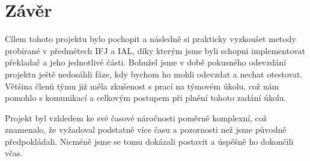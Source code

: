 \documentclass[a4paper, 12pt]{article} %
\begin{document}
    \section{Závěr}
        Cílem tohoto projektu bylo pochopit a následně si prakticky vyzkoušet metody 
        probírané v předmětech IFJ a IAL, díky kterým jsme byli schopni implementovat 
        překladač a jeho jednotlivé části. Bohužel jsme v době pokusného odevzdání 
        projektu ještě nedosáhli fáze, kdy bychom ho mohli odevzdat a nechat otestovat.
        Většina členů týmu již měla zkušenost s prací na týmovém úkolu, což nám pomohlo
        s komunikací a celkovým postupem při plnění tohoto zadání úkolu. 
        
        Projekt byl vzhledem ke své časové náročnosti poměrně komplexní, což znamenalo, 
        že vyžadoval podstatně více času a pozornosti než jsme původně předpokládali. 
        Nicméně jsme se tomu dokázali postavit a úspěšně ho dokončili včas.

    
\end{document}
